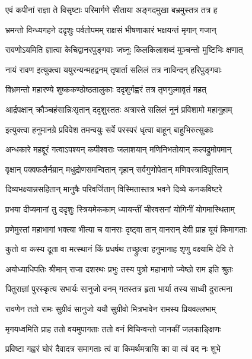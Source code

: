 \twolineshloka
{एवं कपीनां राज्ञा ते विसृष्टाः परिमार्गणे}
{सीताया अङ्गदमुखा बभ्रमुस्तत्र तत्र ह} %

\twolineshloka
{भ्रमन्तो विन्ध्यगहने ददृशुः पर्वतोपमम्}
{राक्षसं भीषणाकारं भक्षयन्तं मृगान् गजान्} %

\twolineshloka
{रावणोऽयमिति ज्ञात्वा केचिद्वानरपुङ्गवाः}
{जघ्नुः किलकिलाशब्दं मुञ्चन्तो मुष्टिभिः क्षणात्} %

\twolineshloka
{नायं रावण इत्युक्त्वा ययुरन्यन्महद्वनम्}
{तृषार्ता सलिलं तत्र नाविन्दन् हरिपुङ्गवाः} %

\twolineshloka
{विभ्रमन्तो महारण्ये शुष्ककण्ठोष्ठतालुकाः}
{ददृशुर्गह्वरं तत्र तृणगुल्मावृतं महत्} %

\twolineshloka
{आर्द्रपक्षान् क्रौञ्चहंसान्निःसृतान् ददृशुस्ततः}
{अत्रास्ते सलिलं नूनं प्रविशामो महागुहाम्} %

\twolineshloka
{इत्युक्त्वा हनुमानग्रे प्रविवेश तमन्वयुः}
{सर्वे परस्परं धृत्वा बाहून् बाहुभिरुत्सुकाः} %

\twolineshloka
{अन्धकारे महद्दूरं गत्वाऽपश्यन् कपीश्वराः}
{जलाशयान् मणिनिभतोयान् कल्पद्रुमोपमान्} %

\twolineshloka
{वृक्षान् पक्वफलैर्नम्रान् मधुद्रोणसमन्वितान्}
{गृहान् सर्वगुणोपेतान् मणिवस्त्रादिपूरितान्} %

\twolineshloka
{दिव्यभक्ष्यान्नसहितान् मानुषैः परिवर्जितान्}
{विस्मितास्तत्र भवने दिव्ये कनकविष्टरे} %

\twolineshloka
{प्रभया दीप्यमानां तु ददृशुः स्त्रियमेककाम्}
{ध्यायन्तीं चीरवसनां योगिनीं योगमास्थिताम्} %

\twolineshloka
{प्रणेमुस्तां महाभागां भक्त्या भीत्या च वानराः}
{दृष्ट्वा तान् वानरान् देवी प्राह यूयं किमागताः} %

\twolineshloka
{कुतो वा कस्य दूता वा मत्स्थानं किं प्रधर्षथ}
{तच्छ्रुत्वा हनुमानाह शृणु वक्ष्यामि देवि ते} %

\twolineshloka
{अयोध्याधिपतिः श्रीमान् राजा दशरथः प्रभुः}
{तस्य पुत्रो महाभागो ज्येष्ठो राम इति श्रुतः} %

\twolineshloka
{पितुराज्ञां पुरस्कृत्य सभार्यः सानुजो वनम्}
{गतस्तत्र हृता भार्या तस्य साध्वी दुरात्मना} %

\twolineshloka
{रावणेन ततो रामः सुग्रीवं सानुजो ययौ}
{सुग्रीवो मित्रभावेन रामस्य प्रियवल्लभाम्} %

\twolineshloka
{मृगयध्वमिति प्राह ततो वयमुपागताः}
{ततो वनं विचिन्वन्तो जानकीं जलकाङ्क्षिणः} %

\twolineshloka
{प्रविष्टा गह्वरं घोरं दैवादत्र समागताः}
{त्वं वा किमर्थमत्रासि का वा त्वं वद नः शुभे} %

